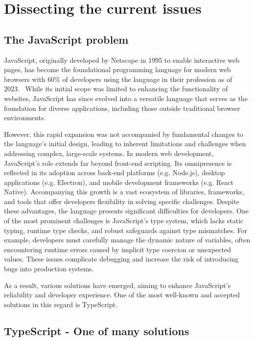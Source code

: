 \section{Dissecting the current issues}

\subsection{The JavaScript problem}

JavaScript, originally developed by Netscape in 1995 to enable interactive web pages, has become the foundational programming language for modern web browsers with 60\% of developers using the language in their profession as of 2023.~\cite{jetbrains2023} While its initial scope was limited to enhancing the functionality of websites, JavaScript has since evolved into a versatile language that serves as the foundation for diverse applications, including those outside traditional browser environments.

However, this rapid expansion was not accompanied by fundamental changes to the language's initial design, leading to inherent limitations and challenges when addressing complex, large-scale systems. In modern web development, JavaScript's role extends far beyond front-end scripting. Its omnipresence is reflected in its adoption across back-end platforms (e.g. Node.js), desktop applications (e.g. Electron), and mobile development frameworks (e.g. React Native). Accompanying this growth is a vast ecosystem of libraries, frameworks, and tools that offer developers flexibility in solving specific challenges. Despite these advantages, the language presents significant difficulties for developers. One of the most prominent challenges is JavaScript’s type system, which lacks static typing, runtime type checks, and robust safeguards against type mismatches. For example, developers must carefully manage the dynamic nature of variables, often encountering runtime errors caused by implicit type coercion or unexpected values. These issues complicate debugging and increase the risk of introducing bugs into production systems.

As a result, various solutions have emerged, aiming to enhance JavaScript's reliability and developer experience. One of the most well-known and accepted solutions in this regard is TypeScript.

\subsection{TypeScript - One of many solutions}

